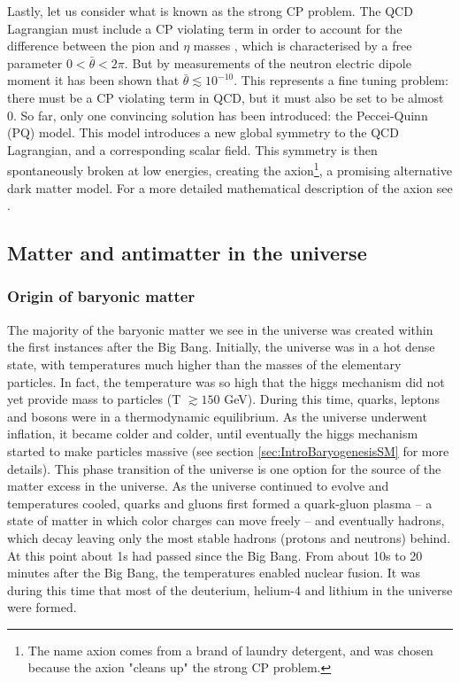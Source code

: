 Lastly, let us consider what is known as the strong CP problem. The QCD Lagrangian must include a CP violating term in order to account for the difference between the pion and $\eta$ masses \cite{tHooft}, which is characterised by a free parameter $0<\bar{\theta}<2\pi$. But by measurements of the neutron electric dipole moment it has been shown that $\bar{\theta} \lesssim 10^{-10}$. This represents a fine tuning problem: there must be a CP violating term in QCD, but it must also be set to be almost 0. So far, only one convincing solution has been introduced: the Peccei-Quinn (PQ) model. This model introduces a new global symmetry to the QCD Lagrangian, and a corresponding scalar field. This symmetry is then spontaneously broken at low energies, creating the axion\footnote{The name axion comes from a brand of laundry detergent, and was chosen because the axion "cleans up" the strong CP problem.}, a promising alternative dark matter model. For a more detailed mathematical description of the axion see \cite{axion_review}.


\subsection{Matter and antimatter in the universe}


\subsubsection{Origin of baryonic matter}
The majority of the baryonic matter we see in the universe was created within the first instances after the Big Bang. Initially, the universe was in a hot dense state, with temperatures much higher than the masses of the elementary particles. In fact, the temperature was so high that the higgs mechanism did not yet provide mass to particles \cite{Higgs_vev_highT} (T $\gtrsim 150$ GeV). During this time, quarks, leptons and bosons were in a thermodynamic equilibrium. As the universe underwent inflation, it became colder and colder, until eventually the higgs mechanism started to make particles massive \cite{Higgs_vev_highT} (see section \ref{sec:IntroBaryogenesisSM} for more details). This phase transition of the universe is one option for the source of the matter excess in the universe.
As the universe continued to evolve and temperatures cooled, quarks and gluons first formed a quark-gluon plasma -- a state of matter in which color charges can move freely \cite{QGP_prediction, Braun_Munzinger_2016} --  and eventually hadrons, which decay leaving only the most stable hadrons (protons and neutrons) behind. At this point about 1s had passed since the Big Bang. From about 10s to 20 minutes after the Big Bang, the temperatures enabled nuclear fusion. It was during this time that most of the deuterium, helium-4 and lithium in the universe were formed. \\


